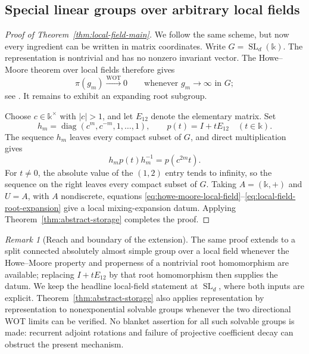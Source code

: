 \documentclass[reqno]{amsart}
\numberwithin{equation}{section}
\theoremstyle{definition}
\theoremstyle{remark}
\newtheorem{remark}[theorem]{Remark}
\begin{document}
\subsection{Special linear groups over arbitrary local fields}

\begin{proof}[Proof of Theorem~\ref{thm:local-field-main}]
We follow the same scheme, but now every ingredient can be written in matrix
coordinates.  Write $G=\operatorname{SL}_d(\mathbb k)$.  The representation is nontrivial
and has no nonzero invariant vector.  The Howe--Moore theorem over local
fields therefore gives
\begin{equation}\label{eq:howe-moore-local-field}
 \pi(g_m)\xrightarrow{\mathrm{WOT}}0
 \qquad\text{whenever }g_m\longrightarrow\infty\text{ in }G;
\end{equation}
see \cite{HoweMoore1979,Ciobotaru2014}.  It remains to exhibit an expanding
root subgroup.

Choose $c\in\mathbb k^\times$ with $|c|>1$, and let $E_{12}$ denote the
elementary matrix.  Set
\begin{equation}\label{eq:local-field-expanding-pair}
 h_m=\operatorname{diag}(c^m,c^{-m},1,\ldots,1),
 \qquad p(t)=I+tE_{12}\quad(t\in\mathbb k).
\end{equation}
The sequence $h_m$ leaves every compact subset of $G$, and direct
multiplication gives
\begin{equation}\label{eq:local-field-root-expansion}
 h_mp(t)h_m^{-1}=p(c^{2m}t).
\end{equation}
For $t\neq0$, the absolute value of the $(1,2)$ entry tends to infinity, so
the sequence on the right leaves every compact subset of $G$.  Taking
$A=(\mathbb k,+)$ and $U=A$, with $A$ nondiscrete, equations
\eqref{eq:howe-moore-local-field}--\eqref{eq:local-field-root-expansion}
give a local mixing-expansion datum.  Applying
Theorem~\ref{thm:abstract-storage} completes the proof.
\end{proof}

\begin{remark}[Reach and boundary of the extension]
The same proof extends to a split connected absolutely almost simple group
over a local field whenever the Howe--Moore property and properness of a
nontrivial root homomorphism are available; replacing $I+tE_{12}$ by that
root homomorphism then supplies the datum.  We keep the headline local-field
statement at $\operatorname{SL}_d$, where both inputs are explicit.
Theorem~\ref{thm:abstract-storage} also applies
representation by representation to nonexponential solvable groups whenever
the two directional WOT limits can be verified.  No blanket assertion for all
such solvable groups is made: recurrent adjoint rotations and failure of
projective coefficient decay can obstruct the present mechanism.
\end{remark}
\end{document}
